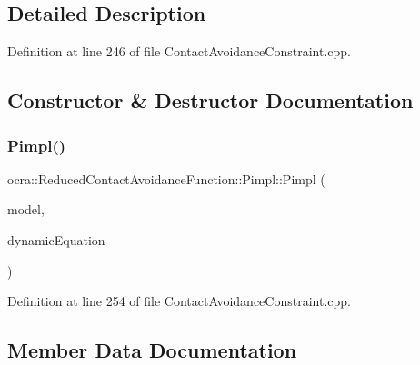 \subsection{Detailed Description}


Definition at line 246 of file Contact\+Avoidance\+Constraint.\+cpp.



\subsection{Constructor \& Destructor Documentation}
\hypertarget{structReducedContactAvoidanceFunction_1_1Pimpl_ab7258766eea3fd037b4e59e381adfdd5}{}\label{structReducedContactAvoidanceFunction_1_1Pimpl_ab7258766eea3fd037b4e59e381adfdd5} 
\subsubsection{\texorpdfstring{Pimpl()}{Pimpl()}}
{\footnotesize\ttfamily ocra\+::\+Reduced\+Contact\+Avoidance\+Function\+::\+Pimpl\+::\+Pimpl (\begin{DoxyParamCaption}\item[{const \hyperlink{classocra_1_1Model}{Model} \&}]{model,  }\item[{const \hyperlink{classocra_1_1FullDynamicEquationFunction}{Full\+Dynamic\+Equation\+Function} \&}]{dynamic\+Equation }\end{DoxyParamCaption})\hspace{0.3cm}{\ttfamily [inline]}}



Definition at line 254 of file Contact\+Avoidance\+Constraint.\+cpp.



\subsection{Member Data Documentation}
\hypertarget{structReducedContactAvoidanceFunction_1_1Pimpl_a2993139449f5c29b4a85a9e3c261834c}{}\label{structReducedContactAvoidanceFunction_1_1Pimpl_a2993139449f5c29b4a85a9e3c261834c} 
